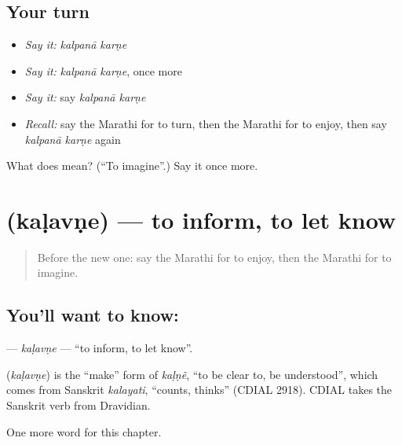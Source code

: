 \subsection*{Your turn}
\begin{itemize}
\raggedright
  \item \emph{Say it:} \emph{kalpanā karṇe}
  \item \emph{Say it:} \emph{kalpanā karṇe}, once more
  \item \emph{Say it:} say \emph{kalpanā karṇe}
  \item \emph{Recall:} say the Marathi for to turn, then the Marathi for to enjoy, then say \emph{kalpanā karṇe} again
\end{itemize}

\begin{tcolorbox}[breakable,colback=teal!4,colframe=teal!35!black,title={Before you move on}]
What does   mean? (\textquotedblleft{}To imagine\textquotedblright{}.) Say it once more.
\end{tcolorbox}
\section[\texorpdfstring{\mr{कळवणे} (kaḷavṇe)}{कळवणे (kaḷavṇe)}]{ (kaḷavṇe) — to inform, to let know}

\label{lesson:MR-C253-kalavne}



\begin{quote}
Before the new one: say the Marathi for to enjoy, then the Marathi for to imagine.
\end{quote}

\subsection*{You'll want to know: }
\textbf{} — \emph{kaḷavṇe} — \textquotedblleft{}to inform, to let know\textquotedblright{}.

\begin{cousinweb}
\textbf{} (\emph{kaḷavṇe}) is the \textquotedblleft{}make\textquotedblright{} form of \emph{kaḷṇẽ}, \textquotedblleft{}to be clear to, be understood\textquotedblright{}, which comes from Sanskrit \emph{kalayati}, \textquotedblleft{}counts, thinks\textquotedblright{} (CDIAL 2918). CDIAL takes the Sanskrit verb from Dravidian.
\end{cousinweb}

\begin{grammarlens}[title={What you've built}]
One more word for this chapter.
\end{grammarlens}

